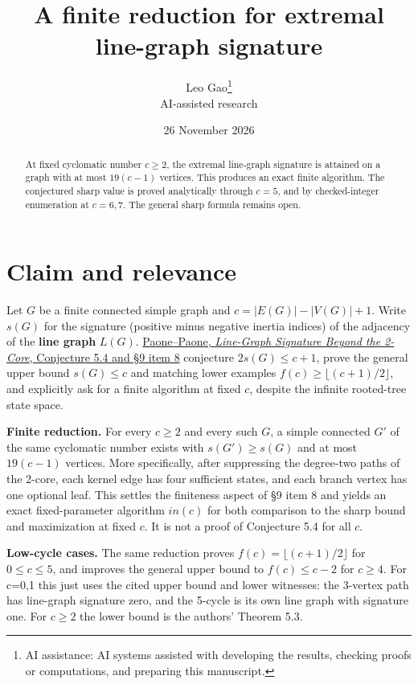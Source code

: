 \documentclass[11pt]{article}
\title{\textcolor{ink}{A finite reduction for extremal line-graph signature}}
\author{Leo Gao\thanks{AI assistance: AI systems assisted with developing the results, checking proofs or computations, and preparing this manuscript.}\\[3pt]\small\textsf{AI-assisted research}}
\date{26 November 2026}
\begin{document}
\maketitle
\begin{abstract}
At fixed cyclomatic number \(c\ge2\), the extremal line-graph signature is attained on a graph with at most \(19(c-1)\) vertices. This produces an exact finite algorithm. The conjectured sharp value is proved analytically through \(c=5\), and by checked-integer enumeration at \(c=6,7\). The general sharp formula remains open.
\end{abstract}
\section{Claim and relevance}\label{claim-and-relevance}

Let \(G\) be a finite connected simple graph and \(c=|E(G)|-|V(G)|+1\). Write \(s(G)\) for the signature (positive minus negative inertia indices) of the adjacency of the \textbf{line graph} \(L(G)\). \href{https://aletheia-technologies.it/en/research/line-graph-signature-beyond-the-2-core/reader/}{Paone--Paone, \emph{Line-Graph Signature Beyond the 2-Core}, Conjecture 5.4 and §9 item 8} conjecture
\(2s(G)\le  c+1\), prove the general upper bound \(s(G)\le  c\) and matching lower examples \(f(c)\ge \lfloor (c+1)/2\rfloor\), and explicitly ask for a finite algorithm at fixed \(c\), despite the infinite rooted-tree state space.

\textbf{Finite reduction.} For every \(c\ge 2\) and every such \(G\), a simple connected \(G'\) of the same cyclomatic number exists with \(s(G')\ge  s(G)\) and at most \(19(c-1)\) vertices. More specifically, after suppressing the degree-two paths of the 2-core, each kernel edge has four sufficient states, and each branch vertex has one optional leaf. This settles the finiteness aspect of §9 item 8 and yields an exact fixed-parameter algorithm \(in (c)\) for both comparison to the sharp bound and maximization at fixed \(c\). It is not a proof of Conjecture 5.4 for all \(c\).

\textbf{Low-cycle cases.} The same reduction proves \(f(c)=\lfloor (c+1)/2\rfloor\) for \(0\le  c\le 5\), and improves the general upper bound to \(f(c)\le  c-2\) for \(c\ge 4\). For c=0,1 this just uses the cited upper bound and lower witnesses: the 3-vertex path has line-graph signature zero, and the 5-cycle is its own line graph with signature one. For \(c\ge 2\) the lower bound is the authors' Theorem 5.3.
\end{document}
